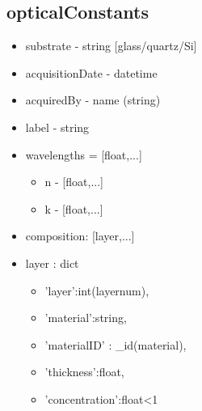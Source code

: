 \documentclass[../thesis.tex]{subfiles}
\begin{document}
\subsection{opticalConstants}
\begin{itemize}
\item substrate - string [glass/quartz/Si]
\item acquisitionDate - datetime
\item acquiredBy - name (string)
\item label - string
\item wavelengths = [float,...]
\begin{itemize}
\item n - [float,...]
\item k - [float,...]
\end{itemize}

\item composition: [layer,...]
\item layer : dict
\begin{itemize}

\item 'layer':int(layernum),
\item 'material':string,
\item 'materialID' : \_id(material),
\item 'thickness':float,
\item 'concentration':float<1 
\end{itemize}

\end{itemize}
\end{document}
